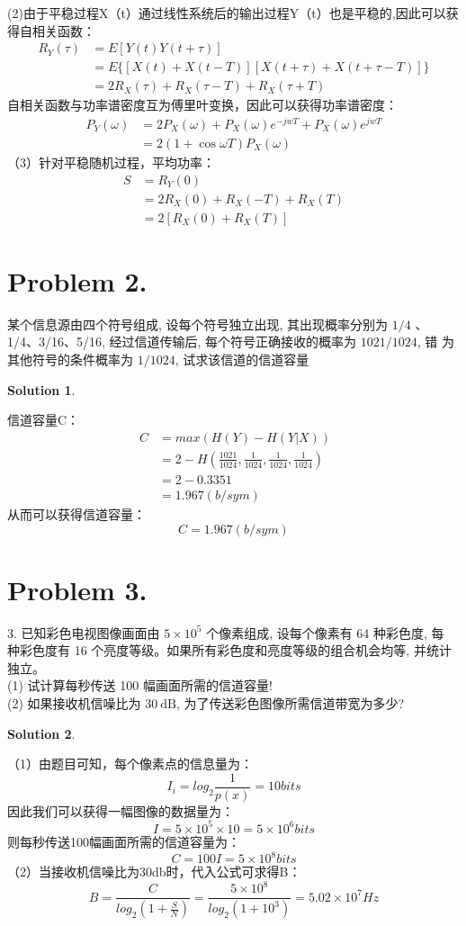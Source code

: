 \documentclass[UTF8,oneside]{article}
\newtheorem*{Solution}{Solution}
\begin{document}
(2)由于平稳过程X（t）通过线性系统后的输出过程Y（t）也是平稳的,因此可以获得自相关函数：
\begin{align*}
R_{Y}(\tau)&=E[Y(t)Y(t+\tau)]\\
&=E\{[X(t)+X(t-T)][X(t+\tau)+X(t+\tau-T)]\}\\
&=2R_X(\tau)+R_X(\tau-T)+R_X(\tau+T)
\end{align*}
自相关函数与功率谱密度互为傅里叶变换，因此可以获得功率谱密度：
\begin{align*}
P_{Y}(\omega)&=2 P_{X}(\omega)+P_{X}(\omega) e^{-j w T}+P_{X}(\omega) e^{j w T} \\
&=2(1+\cos \omega T) P_{X}(\omega)
\end{align*}
（3）针对平稳随机过程，平均功率：
\begin{align*}
S&=R_{Y}(0)\\
&=2R_X(0)+R_X(-T)+R_X(T)\\
&=2[R_X(0)+R_X(T)]
\end{align*}
\section*{Problem 2.}
某个信息源由四个符号组成, 设每个符号独立出现, 其出现概率分别为 $1 / 4$ 、 1/4、3/16、5/16, 经过信道传输后, 每个符号正确接收的概率为 $1021 / 1024$, 错 为其他符号的条件概率为 $1 / 1024$, 试求该信道的信道容量
\begin{Solution}
\end{Solution}
信道容量C：
\begin{align*}\
C&=max(H(Y)-H(Y|X))\\
&=2-H(\frac{1021}{1024},\frac{1}{1024},\frac{1}{1024},\frac{1}{1024})\\
&=2-0.3351\\
&=1.967(b/sym)
\end{align*}
从而可以获得信道容量：$$C=1.967(b/sym)$$
\section*{Problem 3.}
3. 已知彩色电视图像画面由 $5 \times 10^{5}$ 个像素组成, 设每个像素有 64 种彩色度, 每 种彩色度有 16 个亮度等级。如果所有彩色度和亮度等级的组合机会均等, 并统计独立。\\
(1) 试计算每秒传送 100 幅画面所需的信道容量!\\
(2) 如果接收机信噪比为 $30 \mathrm{~dB}$, 为了传送彩色图像所需信道带宽为多少?
\begin{Solution}
\end{Solution}
（1）由题目可知，每个像素点的信息量为：$$I_i=log_2{\frac{1}{p(x)}}=10bits$$
因此我们可以获得一幅图像的数据量为：$$I=5 \times 10^{5}\times 10=5 \times 10^{6}bits$$
则每秒传送100幅画面所需的信道容量为：$$C=100I=5\times 10^{8}bits$$
（2）当接收机信噪比为30db时，代入公式可求得B：$$B=\frac{C}{log_2(1+\frac{S}{N})}=\frac{5\times 10^{8}}{log_2(1+10^3)}=5.02\times 10^{7}Hz$$
\end{document}
